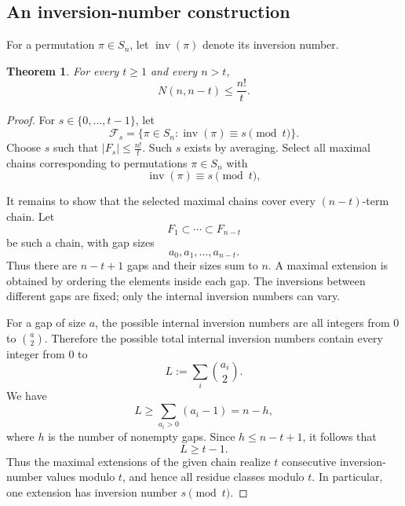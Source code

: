 \documentclass[11pt]{article}
\newtheorem{theorem}{Theorem}[section]
\theoremstyle{definition}
\theoremstyle{remark}
\newcommand{\inv}{\operatorname{inv}}
\newcommand{\balazs}[1]{\textcolor{red}{Balazs: #1}}
\begin{document}
\subsection{An inversion-number construction}

For a permutation $\pi\in S_n$, let $\inv(\pi)$ denote its inversion number.  %

\begin{theorem}\label{thm:mod-upper-proof}
For every $t\ge 1$ and every $n> t$,
\[
   N(n,n-t)\le \frac{n!}{t}.
\]
\end{theorem}

\begin{proof}
For \(s\in\{0,\ldots,t-1\}\), let
\[
   \mathcal F_s
   =
   \{\pi\in S_n:\operatorname{inv}(\pi)\equiv s\pmod t\}.
\]
Choose $s$ such that $|F_s|\le \frac{n!}{t}$. Such $s$ exists by averaging. 
Select all maximal chains corresponding to permutations $\pi\in S_n$ with
\[
   \inv(\pi)\equiv s\pmod t,
\]


It remains to show that the selected maximal chains cover every $(n-t)$-term chain.  Let
\[
  F_1\subset\cdots\subset F_{n-t}
\]
be such a chain, with gap sizes
\[
   a_0,a_1,\ldots,a_{n-t}.
\]
Thus there are $n-t+1$ gaps and their sizes sum to $n$.  A maximal extension is obtained by ordering the elements inside each gap.  The inversions between different gaps are fixed; only the internal inversion numbers can vary.

For a gap of size $a$, the possible internal inversion numbers are all integers from $0$ to $\binom a2$.  Therefore the possible total internal inversion numbers contain every integer from $0$ to
\[
   L:=\sum_i\binom{a_i}{2}.
\]
We have
\[
   L\ge \sum_{a_i>0}(a_i-1)=n-h,
\]
where $h$ is the number of nonempty gaps.  Since $h\le n-t+1$, it follows that
\[
   L\ge t-1.
\]
Thus the maximal extensions of the given chain realize $t$ consecutive inversion-number values modulo $t$, and hence all residue classes modulo $t$.  In particular, one extension has inversion number $s\pmod t$.
\end{proof}
\end{document}
